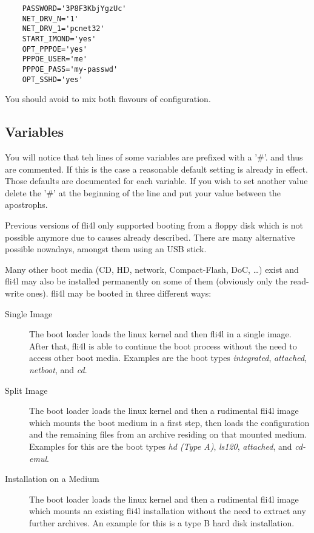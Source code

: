 \begin{example}
\begin{verbatim}
    PASSWORD='3P8F3KbjYgzUc'
    NET_DRV_N='1'
    NET_DRV_1='pcnet32'
    START_IMOND='yes'
    OPT_PPPOE='yes'
    PPPOE_USER='me'
    PPPOE_PASS='my-passwd'
    OPT_SSHD='yes'
\end{verbatim}
\end{example}

You should avoid to mix both flavours of configuration.

\subsection{Variables}

  You will notice that teh lines of some variables are prefixed with a '\#'.
  and thus are commented. If this is the case a reasonable default setting is 
  already in effect. Those defaults are documented for each variable. If you wish
  to set another value delete the '\#' at the beginning of the line and 
  put your value between the apostrophs.


Previous versions of fli4l only supported booting from a floppy disk
which is not possible anymore due to causes already described. There
are many alternative possible nowadays, amongst them using an USB stick.

Many other boot media (CD, HD, network, Compact-Flash, DoC, \ldots)
exist and fli4l may also be installed permanently on some of them
(obviously only the read-write ones). fli4l may be booted in three
different ways:

\begin{description}
\item [Single Image] The boot loader loads the linux kernel and then fli4l
in a single image. After that, fli4l is able to continue the boot process
without the need to access other boot media. Examples are the boot types
\emph{integrated}, \emph{attached}, \emph{netboot}, and \emph{cd}.
\item [Split Image] The boot loader loads the linux kernel and then a
rudimental fli4l image which mounts the boot medium in a first step, then
loads the configuration and the remaining files from an archive residing
on that mounted medium. Examples for this are the boot types \emph{hd (Type A)},
\emph{ls120}, \emph{attached}, and \emph{cd-emul}.
\item [Installation on a Medium] The boot loader loads the linux kernel and
then a rudimental fli4l image which mounts an existing fli4l installation
without the need to extract any further archives. An example for this is a
type B hard disk installation.
\end{description}

